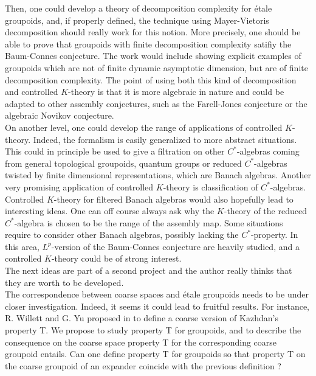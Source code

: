 Then, one could develop a theory of decomposition complexity for étale groupoids, and, if properly defined, the technique using Mayer-Vietoris decomposition should really work for this notion. More precisely, one should be able to prove that groupoids with finite decomposition complexity satifiy the Baum-Connes conjecture. The work would include showing explicit examples of groupoids which are not of finite dynamic asymptotic dimension, but are of finite decomposition complexity. The point of using both this kind of decomposition and controlled $K$-theory is that it is more algebraic in nature and could be adapted to other assembly conjectures, such as the Farell-Jones conjecture or the algebraic Novikov conjecture. \cite{RTY} \\

On another level, one could develop the range of applications of controlled $K$-theory. Indeed, the formalism is easily generalized to more abstract situations. This could in principle be used to give a filtration on other $C^*$-algebras coming from general topological groupoids, quantum groups or reduced $C^*$-algebras twisted by finite dimensional representations, which are Banach algebras. Another very promising application of controlled $K$-theory is classification of $C^*$-algebras. \\

Controlled $K$-theory for filtered Banach algebras would also hopefully lead to interesting ideas. One can off course always ask why the $K$-theory of the reduced $C^*$-algebra is chosen to be the range of the assembly map. Some situations require to consider other Banach algebras, possibly lacking the $C^*$-property. In this area, $L^p$-version of the Baum-Connes conjecture are heavily studied, and a controlled $K$-theory could be of strong interest.\\

The next ideas are part of a second project and the author really thinks that they are worth to be developed.\\

The correspondence between coarse spaces and étale groupoids needs to be under closer investigation. Indeed, it seems it could lead to fruitful results. For instance, R. Willett and G. Yu proposed in \cite{WillettYu} to define a coarse version of Kazhdan's property T. We propose to study property T for groupoids, and to describe the consequence on the coarse space property T for the corresponding coarse groupoid entails. %
Can one define property T for groupoids so that property T on the coarse groupoid of an expander coincide with the previous definition ?\\

